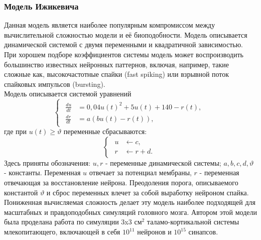 \documentclass[a4paper,10pt]{article}
\begin{document}
\subsubsection{Модель Ижикевича}
\indent Данная модель является наиболее популярным компромиссом между вычислительной сложностью модели и её биоподобности. Модель описывается динамической системой с двумя переменными и квадратичной зависимостью. При хорошем подборе коэффициентов системы модель может воспроизводить большинство известных нейронных паттернов\cite{IzhSimpleModel}, включая, например, такие сложные как, высокочастотные спайки (fast spiking) или взрывной поток спайковых импульсов (bursting).\\
\indent Модель описывается системой уравнений
\begin{equation}\label{eq:izh}
\left\{  \begin{array}{c} \begin{aligned}
	\frac{du}{dt} &= 0,04u(t)^2+5u(t)+140-r(t), \nonumber \\
	\frac{dr}{dt} &= a(bu(t)-r(t)), \nonumber 
	\end{aligned}	
	\end{array} \right.
\end{equation}
где при $u(t) \geq \vartheta$ переменные сбрасываются:
\begin{equation}\label{eq:izh_reset}
\left\{  \begin{array}{c} \begin{aligned}
	u &\leftarrow c \nonumber, \\
	r &\leftarrow r+d.
	\end{aligned}	
	\end{array} \right.
\end{equation}
Здесь приняты обозначения: $u, r$ - переменные динамической системы; $a, b, c, d, \vartheta$ - константы. Переменная $u$ отвечает за потенциал мембраны, $r$ - переменная отвечающая за восстановление нейрона. Преодоления порога, описываемого константой $\vartheta$ и сброс переменных влечет за собой выработку нейроном спайка.\\
\indent Пониженная вычисляемая сложность делает эту модель наиболее подходящей для масштабных и правдоподобных симуляций головного мозга. Автором этой модели была проделана работа \cite{IzhTalam} по симуляции 3x3 см$^2$ таламо-кортикальной системы млекопитающего, включающей в себя $10^{11}$ нейронов и $10^{15}$ синапсов.
\end{document}
